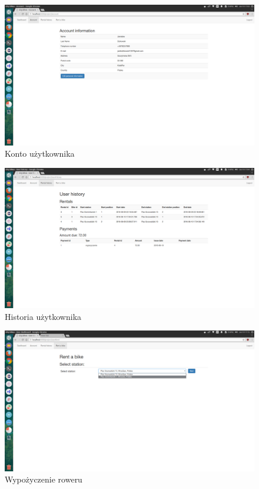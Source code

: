 \documentclass{article}
\begin{document}
\begin{figure}[p]
\centerline{
	\includegraphics[width=\paperwidth, height=\paperheight, keepaspectratio]{screenshots/account.png}}
	\caption{Konto użytkownika}
\end{figure}
\begin{figure}[p]
\centerline{
	\includegraphics[width=\paperwidth, height=\paperheight, keepaspectratio]{screenshots/userHistory.png}}
	\caption{Historia użytkownika}
\end{figure}
\begin{figure}[p]
\centerline{
	\includegraphics[width=\paperwidth, height=\paperheight, keepaspectratio]{screenshots/rentbike.png}}
	\caption{Wypożyczenie roweru}
\end{figure}
\end{document}
